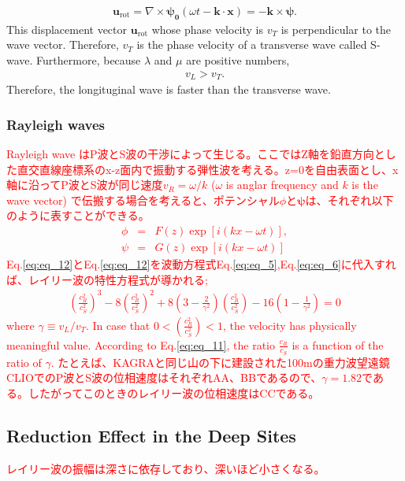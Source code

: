 \begin{eqnarray}
  \bm{u}_{\mathrm{rot}} = \nabla\times{\bm{\psi_{0}}(\omega{t}-\bm{k}\cdot{\bm{x}})} =-\bm{k}\times{\bm{\psi}}.
\end{eqnarray}
This displacement vector $\bm{u}_{\mathrm{rot}}$ whose phase velocity is $v_{T}$ is perpendicular to the wave vector. Therefore, $v_{T}$ is the phase velocity of a transverse wave called S-wave. Furthermore, because  $\lambda$ and $\mu$ are positive numbers, 
\begin{eqnarray}
  v_{L} > v_{T}.\label{eq:eq_10}
\end{eqnarray}
Therefore, the longituginal wave is faster than the transverse wave.



\subsubsection{Rayleigh waves}
\textcolor{red}{
  Rayleigh wave はP波とS波の干渉によって生じる\cite{}。ここではZ軸を鉛直方向とした直交直線座標系のx-z面内で振動する弾性波を考える。z=0を自由表面とし、x軸に沿ってP波とS波が同じ速度$v_{R}=\omega/k$ ($\omega$ is anglar frequency and $k$ is the wave vector) で伝搬する場合を考えると、ポテンシャル$\phi$と$\bm{\psi}$は、それぞれ以下のように表すことができる。
\begin{eqnarray}
  \phi &=& F(z)\exp[i(kx-\omega{t})],\label{eq:eq_12}\\
  \psi &=& G(z)\exp[i(kx-\omega{t})]\label{eq:eq_13}
\end{eqnarray}
Eq.\ref{eq:eq_12}とEq.\ref{eq:eq_12}を波動方程式Eq.\ref{eq:eq_5},Eq.\ref{eq:eq_6}に代入すれば、レイリー波の特性方程式が導かれる;
\begin{eqnarray}\label{eq:eq_11}
\left(\frac{c_{R}^{2}}{c_{S}^{2}}\right)^{3}-8\left(\frac{c_{R}^{2}}{c_{S}^{2}}\right)^{2}+8\left(3-\frac{2}{\gamma^2}\right)\left(\frac{c_{R}^{2}}{c_{S}^{2}}\right)-16\left(1-\frac{1}{\gamma^2}\right)=0
\end{eqnarray}
where $\gamma\equiv v_{L}/v_{T}$. In case that $0 < (\frac{c_{R}^2}{c_{S}^2}) <1$, the velocity has physically meaningful value. According to Eq.\ref{eq:eq_11}, the ratio $\frac{c_R}{c_S}$ is a function of the ratio of $\gamma$. たとえば、KAGRAと同じ山の下に建設された100mの重力波望遠鏡CLIOでのP波とS波の位相速度はそれぞれAA、BBである\cite{takemoto2003}ので、$\gamma = 1.82 $である。したがってこのときのレイリー波の位相速度はCCである。
}



\subsection{Reduction Effect in the Deep Sites}
\textcolor{red}{
  レイリー波の振幅は深さに依存しており、深いほど小さくなる。
}



